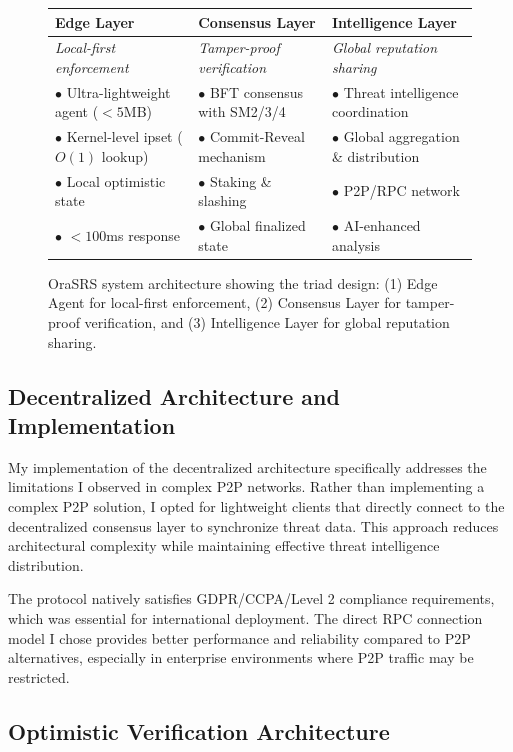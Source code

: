 \documentclass[12pt]{article}
\begin{document}
\begin{figure}[H]
\centering
\begin{tabular}{|p{}|p{}|p{}|}
\hline
\textbf{Edge Layer} & \textbf{Consensus Layer} & \textbf{Intelligence Layer} \\
\hline
\textit{Local-first enforcement} & \textit{Tamper-proof verification} & \textit{Global reputation sharing} \\
\hline
$\bullet$ Ultra-lightweight agent ($<5$MB) & $\bullet$ BFT consensus with SM2/3/4 & $\bullet$ Threat intelligence coordination \\
$\bullet$ Kernel-level ipset ($O(1)$ lookup) & $\bullet$ Commit-Reveal mechanism & $\bullet$ Global aggregation \& distribution \\
$\bullet$ Local optimistic state & $\bullet$ Staking \& slashing & $\bullet$ P2P/RPC network \\
$\bullet$ $<100$ms response & $\bullet$ Global finalized state & $\bullet$ AI-enhanced analysis \\
\hline
\end{tabular}
\caption{OraSRS system architecture showing the triad design: (1) Edge Agent for local-first enforcement, (2) Consensus Layer for tamper-proof verification, and (3) Intelligence Layer for global reputation sharing.}
\label{fig:architecture}
\end{figure}

\subsection{Decentralized Architecture and Implementation}


My implementation of the decentralized architecture specifically addresses the limitations I observed in complex P2P networks. Rather than implementing a complex P2P solution, I opted for lightweight clients that directly connect to the decentralized consensus layer to synchronize threat data. This approach reduces architectural complexity while maintaining effective threat intelligence distribution.

The protocol natively satisfies GDPR/CCPA/Level 2 compliance requirements, which was essential for international deployment. The direct RPC connection model I chose provides better performance and reliability compared to P2P alternatives, especially in enterprise environments where P2P traffic may be restricted.

\subsection{Optimistic Verification Architecture}
\end{document}
